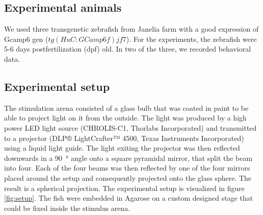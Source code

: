 \subsection{Experimental animals}

We used three transgenetic zebrafish from Janelia farm with a good expression of Gcamp6 gen ($tg(HuC:GCamp6f)jf7$). For the experiments, the zebrafish were 5-6 days postfertilization (dpf) old. In two of the three, we recorded behavioral data.    

\subsection{Experimental setup}

The stimulation arena consisted of a glass bulb that was coated in paint to be able to project light on it from the outside. The light was produced by a high power LED light source (CHROLIS-C1, Thorlabs Incorporated) and transmitted to a projector (DLP® LightCrafter™ 4500, Texas Instruments Incorporated) using a liquid light guide. The light exiting the projector was then reflected downwards in a \SI{90}{\degree} angle onto a square pyramidal mirror, that split the beam into four. Each of the four beams was then reflected by one of the four mirrors placed around the setup and consequently projected onto the glass sphere. The result is a spherical projection. The experimental setup is visualized in figure \ref{fig:setup}. The fish were embedded in Agarose on a custom designed stage that could be fixed inside the stimulus arena.  


